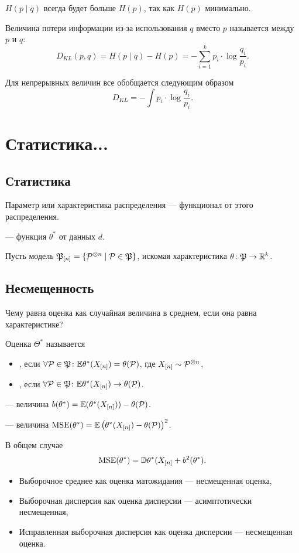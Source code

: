 \documentclass[11pt]{book}
\begin{document}
$H(p \mid q)$ всегда будет больше $H(p)$, так как $H(p)$ минимально.
\begin{definition}[]
	Величина потери информации из-за использования $q$ вместо $p$ называется  между $p$ и $q$:
	\[
	D_{KL} (p, q) = H(p \mid q) - H(p) = - \sum_{i=1}^{k} p_i \cdot \log{\frac{q_i}{p_i}}
	.\] 
\end{definition}
Для непрерывных величин все обобщается следующим образом 
\[
D_{KL} = - \int p_i \cdot \log{\frac{q_{i}}{p_i}}
.\] 

\section{Статистика...}
\subsection{Статистика}
Параметр или характеристика распределения --- функционал от этого распределения.
\begin{definition}[]
	 ---  функция $\theta^*$ от данных $d$.
\end{definition}

Пусть модель $\PP_{[n]} = \{\P ^{\otimes n} \mid \P \in \PP\}$, искомая характеристика $\theta\colon \PP \to \R^{k}$.

\subsection{Несмещенность}
Чему равна оценка как случайная величина в среднем, если она равна характеристике?

\begin{definition}[]
	Оценка $\Theta^*$ называется
	\begin{itemize}
		\item {}, если $\forall \P \in \PP\colon \E \theta^*(X_{[n]}) = \theta(\P)$, где $X_{[n]} \sim \P^{\otimes n}$,
		\item {}, если $\forall \P \in \PP\colon \E \theta^*(X_{[n]}) \to \theta(\P)$.
	\end{itemize}

	 --- величина $b(\theta^*) = \E(\theta^*(X_{[n]})) - \theta(\P)$.

	 --- величина $\MSE(\theta^*) = \E \left( \theta^*(X_{[n]}) - \theta(\P) \right) ^2$.
\end{definition}
В общем случае 
\[
\MSE(\theta^*) = \D \theta^*(X_{[n]} + b^2(\theta^*)
.\] 
\begin{itemize}
	\item Выборочное среднее как оценка матожидания --- несмещенная оценка,
	\item Выборочная дисперсия как оценка дисперсии --- асимптотически несмещенная,
	\item Исправленная выборочная дисперсия как оценка дисперсии --- несмещенная оценка.
\end{itemize}
\end{document}
